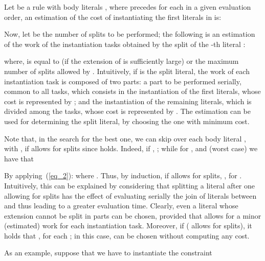 \documentclass[preprint]{tlp}
\begin{document}
Let  be a rule with  body literals ,
where  precedes  for each  in a given evaluation order,
an estimation of the cost of instantiating the first  literals in  is:


Now, let  be the number of splits to be performed; the following is
an estimation of the work of the instantiation tasks obtained by the split of the -th literal :

where,  is  equal to  (if the extension of  is sufficiently large) or the maximum number of splits allowed by .
Intuitively, if  is the split literal, the work of each instantiation task is composed of two parts:
a part to be performed serially, common to all tasks, which consists in the instantiation of the first  literals,
whose cost is represented by ;
and the instantiation of the remaining literals, which is divided among the  tasks, whose cost is represented by
.
The estimation  can be used for determining the split literal, by choosing the one with minimum cost.

Note that, in the search for the best one, we can skip over each body literal , with , if  allows for  splits since     holds.
Indeed, if , ; while for ,   and  (worst case) we have that

By applying~(\ref{eq_2}):
 where .
Thus, by induction, if  allows for  splits,    , for .
Intuitively, this can be explained by considering that splitting a literal  after one allowing for  splits 
has the effect of evaluating serially the join of literals between  and  thus leading to a greater evaluation time.
Clearly, even a literal  whose extension cannot be split in  parts can be chosen, provided that  allows for a minor (estimated) work for each instantiation task.
Moreover, if  ( allows for  splits), it holds that , for each ;
in this case,  can be chosen without computing any cost.

As an example, suppose that we have to instantiate the constraint
 
\end{document}
